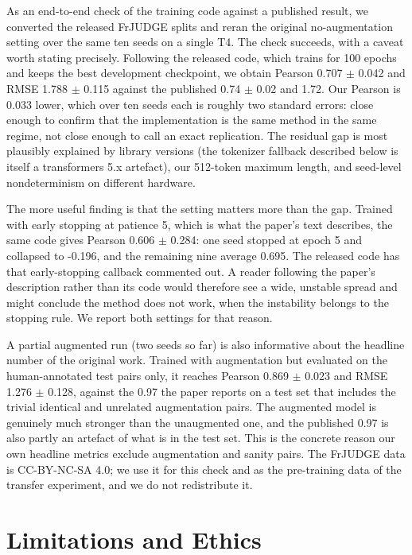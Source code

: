 \documentclass[conference]{IEEEtran}
\begin{document}
As an end-to-end check of the training code against a published result, we converted the released FrJUDGE splits and reran the original no-augmentation setting over the same ten seeds on a single T4. The check succeeds, with a caveat worth stating precisely. Following the released code, which trains for 100 epochs and keeps the best development checkpoint, we obtain Pearson 0.707 \ensuremath{\pm} 0.042 and RMSE 1.788 \ensuremath{\pm} 0.115 against the published 0.74 \ensuremath{\pm} 0.02 and 1.72. Our Pearson is 0.033 lower, which over ten seeds each is roughly two standard errors: close enough to confirm that the implementation is the same method in the same regime, not close enough to call an exact replication. The residual gap is most plausibly explained by library versions (the tokenizer fallback described below is itself a transformers 5.x artefact), our 512-token maximum length, and seed-level nondeterminism on different hardware.

The more useful finding is that the setting matters more than the gap. Trained with early stopping at patience 5, which is what the paper's text describes, the same code gives Pearson 0.606 \ensuremath{\pm} 0.284: one seed stopped at epoch 5 and collapsed to -0.196, and the remaining nine average 0.695. The released code has that early-stopping callback commented out. A reader following the paper's description rather than its code would therefore see a wide, unstable spread and might conclude the method does not work, when the instability belongs to the stopping rule. We report both settings for that reason.

A partial augmented run (two seeds so far) is also informative about the headline number of the original work. Trained with augmentation but evaluated on the human-annotated test pairs only, it reaches Pearson 0.869 \ensuremath{\pm} 0.023 and RMSE 1.276 \ensuremath{\pm} 0.128, against the 0.97 the paper reports on a test set that includes the trivial identical and unrelated augmentation pairs. The augmented model is genuinely much stronger than the unaugmented one, and the published 0.97 is also partly an artefact of what is in the test set. This is the concrete reason our own headline metrics exclude augmentation and sanity pairs. The FrJUDGE data is CC-BY-NC-SA 4.0; we use it for this check and as the pre-training data of the transfer experiment, and we do not redistribute it.

\section{Limitations and Ethics}
\end{document}

